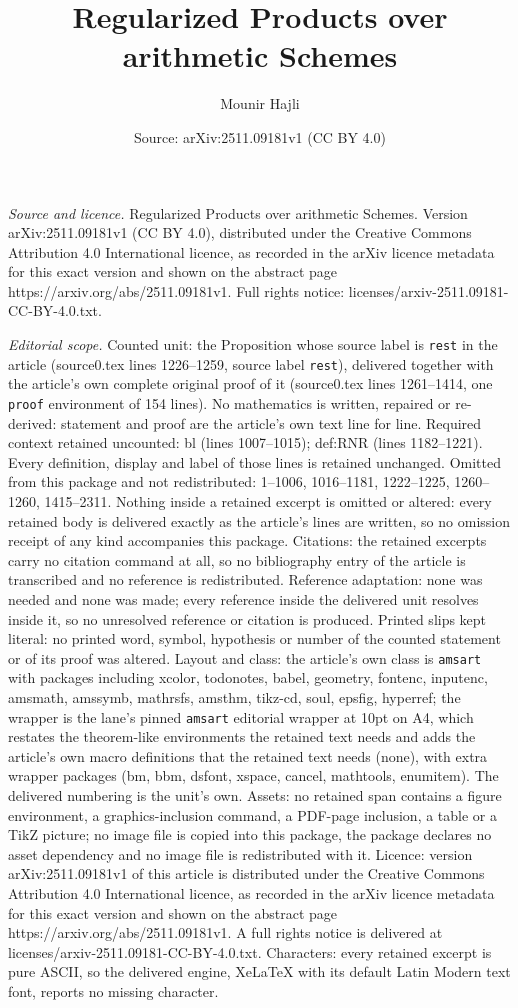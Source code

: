 \documentclass[10pt,a4paper]{amsart}
\title[Regularized Products over arithmetic Schemes]{Regularized Products over arithmetic Schemes}
\author{Mounir Hajli}
\date{Source: arXiv:2511.09181v1 (CC BY 4.0)}
\begin{document}
\maketitle

\noindent\emph{Source and licence.} Regularized Products over arithmetic Schemes. Version arXiv:2511.09181v1 (CC BY 4.0), distributed under the Creative Commons Attribution 4.0 International licence, as recorded in the arXiv licence metadata for this exact version and shown on the abstract page https://arxiv.org/abs/2511.09181v1. Full rights notice: licenses/arxiv-2511.09181-CC-BY-4.0.txt.\par\smallskip

\noindent\textit{Editorial scope.} Counted unit: the Proposition whose source label is \texttt{rest} in the article (source0.tex lines 1226--1259, source label \texttt{rest}), delivered together with the article's own complete original proof of it (source0.tex lines 1261--1414, one \texttt{proof} environment of 154 lines). No mathematics is written, repaired or re-derived: statement and proof are the article's own text line for line. Required context retained uncounted: bl (lines 1007--1015); def:RNR (lines 1182--1221). Every definition, display and label of those lines is retained unchanged. Omitted from this package and not redistributed: 1--1006, 1016--1181, 1222--1225, 1260--1260, 1415--2311. Nothing inside a retained excerpt is omitted or altered: every retained body is delivered exactly as the article's lines are written, so no omission receipt of any kind accompanies this package. Citations: the retained excerpts carry no citation command at all, so no bibliography entry of the article is transcribed and no reference is redistributed. Reference adaptation: none was needed and none was made; every reference inside the delivered unit resolves inside it, so no unresolved reference or citation is produced. Printed slips kept literal: no printed word, symbol, hypothesis or number of the counted statement or of its proof was altered. Layout and class: the article's own class is \texttt{amsart} with packages including xcolor, todonotes, babel, geometry, fontenc, inputenc, amsmath, amssymb, mathrsfs, amsthm, tikz-cd, soul, epsfig, hyperref; the wrapper is the lane's pinned \texttt{amsart} editorial wrapper at 10pt on A4, which restates the theorem-like environments the retained text needs and adds the article's own macro definitions that the retained text needs (none), with extra wrapper packages (bm, bbm, dsfont, xspace, cancel, mathtools, enumitem). The delivered numbering is the unit's own. Assets: no retained span contains a figure environment, a graphics-inclusion command, a PDF-page inclusion, a table or a TikZ picture; no image file is copied into this package, the package declares no asset dependency and no image file is redistributed with it. Licence: version arXiv:2511.09181v1 of this article is distributed under the Creative Commons Attribution 4.0 International licence, as recorded in the arXiv licence metadata for this exact version and shown on the abstract page https://arxiv.org/abs/2511.09181v1. A full rights notice is delivered at licenses/arxiv-2511.09181-CC-BY-4.0.txt. Characters: every retained excerpt is pure ASCII, so the delivered engine, XeLaTeX with its default Latin Modern text font, reports no missing character.
\end{document}
